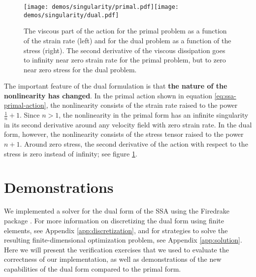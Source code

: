 \documentclass[twocolumn,letterpaper]{igs}
\begin{document}
\begin{figure}[h]
    \texttt{[image: demos/singularity/primal.pdf]}\texttt{[image: demos/singularity/dual.pdf]}
    \caption{The viscous part of the action for the primal problem as a function of the strain rate (left) and for the dual problem as a function of the stress (right).
    The second derivative of the viscous dissipation goes to infinity near zero strain rate for the primal problem, but to zero near zero stress for the dual problem.}
    \label{fig:primal-vs-dual}
\end{figure}

The important feature of the dual formulation is that \textbf{the nature of the nonlinearity has changed}.
In the primal action shown in equation \eqref{eq:ssa-primal-action}, the nonlinearity consists of the strain rate raised to the power $\frac{1}{n} + 1$.
Since $n > 1$, the nonlinearity in the primal form has an infinite singularity in its second derivative around any velocity field with zero strain rate.
In the dual form, however, the nonlinearity consists of the stress tensor raised to the power $n + 1$.
Around zero stress, the second derivative of the action with respect to the stress is zero instead of infinity; see figure \ref{fig:primal-vs-dual}.



\section{Demonstrations}

We implemented a solver for the dual form of the SSA using the Firedrake package \citep{FiredrakeUserManual}.
For more information on discretizing the dual form using finite elements, see Appendix \ref{app:discretization}, and for strategies to solve the resulting finite-dimensional optimization problem, see Appendix \ref{app:solution}.
Here we will present the verification exercises that we used to evaluate the correctness of our implementation, as well as demonstrations of the new capabilities of the dual form compared to the primal form.
\end{document}
